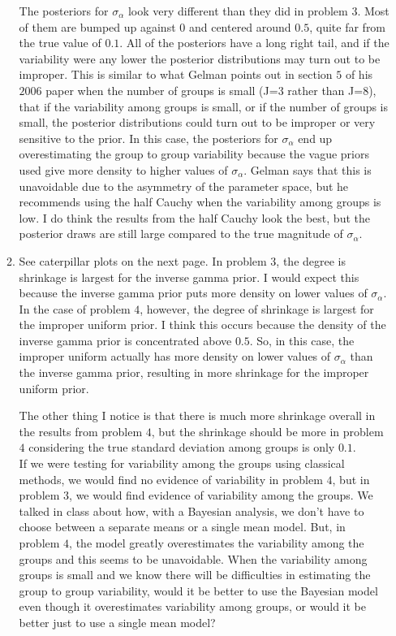 \documentclass[12pt]{article}\usepackage[]{graphicx}\usepackage[]{color}
\begin{document}
\begin{doublespacing}
\begin{enumerate}
\begin{enumerate}
The posteriors for $\sigma_{\alpha}$ look very different than they did in problem $3$. Most of them are bumped up against $0$ and centered around $0.5$, quite far from the true value of $0.1$. All of the posteriors have a long right tail, and if the variability were any lower the posterior distributions may turn out to be improper. This is similar to what Gelman points out in section $5$ of his $2006$ paper when the number of groups is small (J=3 rather than J=8), that if the variability among groups is small, or if the number of groups is small, the posterior distributions could turn out to be improper or very sensitive to the prior. In this case, the posteriors for $\sigma_{\alpha}$ end up overestimating the group to group variability because the vague priors used give more density to higher values of $\sigma_{\alpha}$. Gelman says that this is unavoidable due to the asymmetry of the parameter space, but he recommends using the half Cauchy when the variability among groups is low. I do think the results from the half Cauchy look the best, but the posterior draws are still large compared to the true magnitude of $\sigma_{\alpha}$.



\item See caterpillar plots on the next page. In problem $3$, the degree is shrinkage is largest for the inverse gamma prior. I would expect this because the inverse gamma prior puts more density on lower values of $\sigma_{\alpha}$. In the case of problem $4$, however, the degree of shrinkage is largest for the improper uniform prior. I think this occurs because the density of the inverse gamma prior is concentrated above $0.5$. So, in this case, the improper uniform actually has more density on lower values of $\sigma_{\alpha}$ than the inverse gamma prior, resulting in more shrinkage for the improper uniform prior.

The other thing I notice is that there is much more shrinkage overall in the results from problem $4$, but the shrinkage should be more in problem $4$ considering the true standard deviation among groups is only $0.1$. \\

If we were testing for variability among the groups using classical methods, we would find no evidence of variability in problem $4$, but in problem $3$, we would find evidence of variability among the groups. We talked in class about how, with a Bayesian analysis, we don't have to choose between a separate means or a single mean model. But, in problem $4$, the model greatly overestimates the variability among the groups and this seems to be unavoidable. When the variability among groups is small and we know there will be difficulties in estimating the group to group variability, would it be better to use the Bayesian model even though it overestimates variability among groups, or would it be better just to use a single mean model?


\end{enumerate}
\end{enumerate}
\end{doublespacing}
\end{document}
